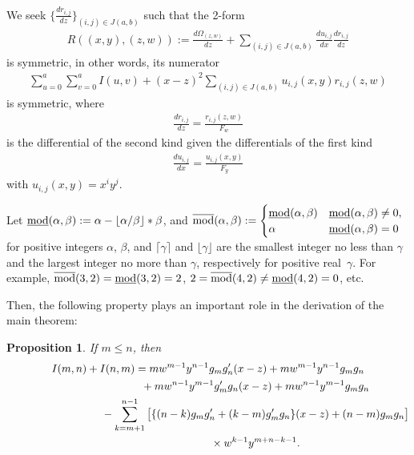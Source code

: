 \documentclass[pdftex]{sigma}
\numberwithin{equation}{section}
\newtheorem{prop}[teiri]{Proposition}
\theoremstyle{definition}
\begin{document}
We seek $ \{\frac{dr_{i,j}}{dz}\}_{(i,j)\in J(a,b)}$ such that the 2-form
\begin{gather*}R((x,y),(z,w)):=\frac{d\Omega_{(z,w)}}{dz}+\sum_{(i,j)\in J(a,b)}\frac{du_{i,j}}{dx}\frac{dr_{i,j}}{dz}\end{gather*}
is symmetric, in other words, its numerator
\begin{gather*}\sum_{u=0}^{a}\sum_{v=0}^{a}
I(u,v)+ (x-z)^2\sum_{(i,j)\in J(a,b)}u_{i,j}(x,y)r_{i,j}(z,w)\end{gather*}
is symmetric, where
\begin{gather*}\frac{dr_{i,j}}{dz}=\frac{r_{i,j}(z,w)}{F_w}\end{gather*}
is the dif\/ferential of the second kind given the dif\/ferentials of the f\/irst kind{\samepage
\begin{gather*}\frac{du_{i,j}}{dx}=\frac{u_{i,j}(x,y)}{F_y}\end{gather*}
with $u_{i,j}(x,y)=x^iy^j$.}

Let $\underline{\rm mod}(\alpha,\beta):=\alpha-\lfloor\alpha/\beta\rfloor*\beta$, and $\overline{\rm mod}(\alpha,\beta):=
\begin{cases}
\underline{\rm mod}(\alpha,\beta)&\underline{\rm mod}(\alpha,\beta)\not=0,\\
\alpha&\underline{\rm mod}(\alpha,\beta)=0
\end{cases}$
for positive integers $\alpha$, $\beta$, and $\lceil\gamma\rceil$ and $\lfloor\gamma\rfloor$ are the smallest integer no less than $\gamma$ and the largest integer no more than $\gamma$, respectively for positive real~$\gamma$. For example, $\overline{\rm mod}(3,2)=\underline{\rm mod}(3,2)=2$, $2=\overline{\rm mod}(4,2)\not=\underline{\rm mod}(4,2)=0$, etc.

Then, the following property plays an important role in the derivation of the main theorem:

\begin{prop}\label{proposition2} If $m\leq n$, then
\begin{gather}
I(m,n)+I(n,m) =mw^{m-1}y^{n-1}g_mg_n'(x-z)+mw^{m-1}y^{n-1}g_mg_n\nonumber\\
\hphantom{I(m,n)+I(n,m) =}{} +mw^{n-1}y^{m-1}g_m'g_n(x-z)+mw^{n-1}y^{m-1}g_mg_n \nonumber\\%
\hphantom{I(m,n)+I(n,m) =}{}
-\sum_{k=m+1}^{n-1}\big[\{(n-k)g_mg_n'+(k-m)g_m'g_n\}(x-z)+(n-m)g_mg_n\big]\nonumber\\
\hphantom{I(m,n)+I(n,m) =}{}\times w^{k-1}y^{m+n-k-1}. \label{eq401}
\end{gather}
\end{prop}
\end{document}

